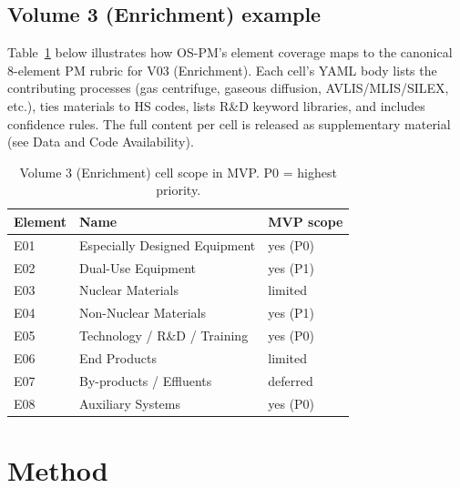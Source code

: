 \documentclass[11pt,a4paper]{article}
\begin{document}
\subsection{Volume 3 (Enrichment) example}

Table~\ref{tab:v03} below illustrates how OS-PM's element coverage maps
to the canonical 8-element PM rubric for V03 (Enrichment). Each cell's
YAML body lists the contributing processes (gas centrifuge, gaseous
diffusion, AVLIS/MLIS/SILEX, etc.), ties materials to HS codes, lists
R\&D keyword libraries, and includes confidence rules. The full
content per cell is released as supplementary material (see Data and
Code Availability).

\begin{table}[h]
  \centering
  \small
  \begin{tabular}{lll}
  \toprule
  Element & Name & MVP scope \\
  \midrule
  E01 & Especially Designed Equipment & yes (P0) \\
  E02 & Dual-Use Equipment            & yes (P1) \\
  E03 & Nuclear Materials             & limited \\
  E04 & Non-Nuclear Materials         & yes (P1) \\
  E05 & Technology / R\&D / Training  & yes (P0) \\
  E06 & End Products                  & limited \\
  E07 & By-products / Effluents       & deferred \\
  E08 & Auxiliary Systems             & yes (P0) \\
  \bottomrule
  \end{tabular}
  \caption{Volume 3 (Enrichment) cell scope in MVP. P0 = highest priority.}
  \label{tab:v03}
\end{table}

\section{Method}\label{sec:method}
\end{document}
